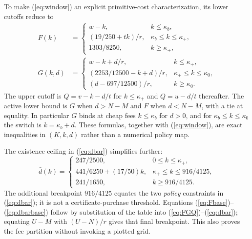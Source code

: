 \documentclass[11pt]{article}
\begin{document}
To make (\ref{eq:window}) an explicit primitive-cost characterization, its lower cutoffs reduce to
\begin{align}
 F(k)&=\begin{cases}w-k,&k\leq\kappa_b,\\
 (19/250+tk)/r,&\kappa_b\leq k\leq\kappa_+,\\
 1303/8250,&k\geq\kappa_+,
 \end{cases}\label{eq:Fbase}\\
 G(k,d)&=\begin{cases}w-k+d/r,&k\leq\kappa_+,\\
 (2253/12500-k+d)/r,&\kappa_+\leq k\leq\kappa_0,\\
 (d-697/12500)/r,&k\geq\kappa_0.
 \end{cases}\label{eq:Gbase}
\end{align}
The upper cutoff is $Q=v-k-d/t$ for $k\leq\kappa_+$ and $Q=u-d/t$ thereafter. The active lower bound is $G$ when $d>N-M$ and $F$ when $d<N-M$, with a tie at equality. In particular $G$ binds at cheap fees $k\leq\kappa_b$ for $d>0$, and for $\kappa_b\leq k\leq\kappa_0$ the switch is $k=\kappa_b+d$. These formulas, together with (\ref{eq:window}), are exact inequalities in $(K,k,d)$ rather than a numerical policy map.

The existence ceiling in (\ref{eq:dbar}) simplifies further:
\begin{equation}
 \bar d(k)=\begin{cases}
 247/2500,&0\leq k\leq\kappa_+,\\
 441/6250+(17/50)k,&\kappa_+\leq k\leq916/4125,\\
 241/1650,&k\geq916/4125.
 \end{cases}\label{eq:dbarbase}
\end{equation}
The additional breakpoint $916/4125$ equates the two \emph{policy} constraints in (\ref{eq:dbar}); it is not a certificate-purchase threshold. Equations (\ref{eq:Fbase})--(\ref{eq:dbarbase}) follow by substitution of the table into (\ref{eq:FGQ})--(\ref{eq:dbar}); equating $U-M$ with $(U-N)/r$ gives that final breakpoint. This also proves the fee partition without invoking a plotted grid.
\end{document}
